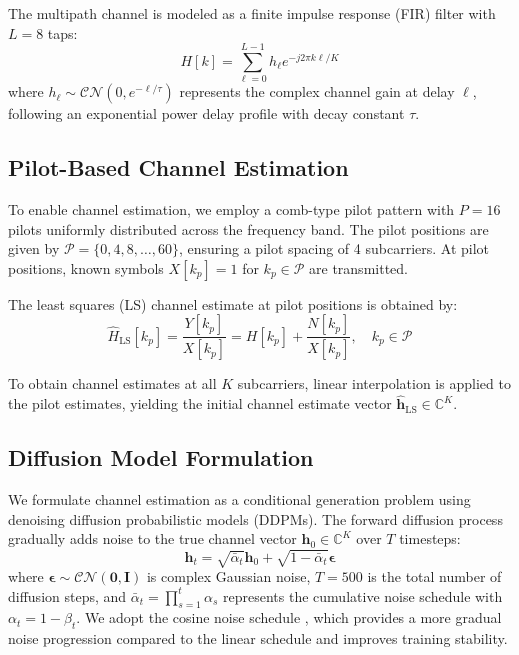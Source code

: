 \documentclass[conference]{IEEEtran}
\begin{document}
The multipath channel is modeled as a finite impulse response (FIR) filter with $L = 8$ taps:
\begin{equation}
H[k] = \sum_{\ell=0}^{L-1} h_\ell e^{-j2\pi k\ell/K}
\end{equation}
where $h_\ell \sim \mathcal{CN}(0, e^{-\ell/\tau})$ represents the complex channel gain at delay $\ell$, following an exponential power delay profile with decay constant $\tau$.

\subsection{Pilot-Based Channel Estimation}

To enable channel estimation, we employ a comb-type pilot pattern with $P = 16$ pilots uniformly distributed across the frequency band. The pilot positions are given by $\mathcal{P} = \{0, 4, 8, \ldots, 60\}$, ensuring a pilot spacing of 4 subcarriers. At pilot positions, known symbols $X[k_p] = 1$ for $k_p \in \mathcal{P}$ are transmitted.

The least squares (LS) channel estimate at pilot positions is obtained by:
\begin{equation}
\hat{H}_{\text{LS}}[k_p] = \frac{Y[k_p]}{X[k_p]} = H[k_p] + \frac{N[k_p]}{X[k_p]}, \quad k_p \in \mathcal{P}
\end{equation}

To obtain channel estimates at all $K$ subcarriers, linear interpolation is applied to the pilot estimates, yielding the initial channel estimate vector $\hat{\mathbf{h}}_{\text{LS}} \in \mathbb{C}^K$.

\subsection{Diffusion Model Formulation}

We formulate channel estimation as a conditional generation problem using denoising diffusion probabilistic models (DDPMs). The forward diffusion process gradually adds noise to the true channel vector $\mathbf{h}_0 \in \mathbb{C}^K$ over $T$ timesteps:
\begin{equation}
\mathbf{h}_t = \sqrt{\bar{\alpha}_t} \mathbf{h}_0 + \sqrt{1 - \bar{\alpha}_t} \boldsymbol{\epsilon}
\end{equation}
where $\boldsymbol{\epsilon} \sim \mathcal{CN}(\mathbf{0}, \mathbf{I})$ is complex Gaussian noise, $T = 500$ is the total number of diffusion steps, and $\bar{\alpha}_t = \prod_{s=1}^t \alpha_s$ represents the cumulative noise schedule with $\alpha_t = 1 - \beta_t$. We adopt the cosine noise schedule \cite{nichol2021improved}, which provides a more gradual noise progression compared to the linear schedule and improves training stability.
\end{document}

